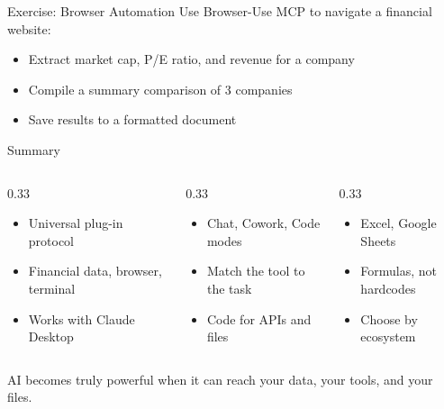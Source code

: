 \documentclass[aspectratio=169]{beamer}
\begin{document}
\begin{frame}{Exercise: Browser Automation}
Use Browser-Use MCP to navigate a financial website:
\begin{itemize}
  \item Extract market cap, P/E ratio, and revenue for a company
  \item Compile a summary comparison of 3 companies
  \item Save results to a formatted document
\end{itemize}
\end{frame}

\begin{frame}{Summary}
\begin{columns}[T]
\begin{column}{0.33\textwidth}
\begin{shadedbox}[title=\textbf{MCP}]
\begin{itemize}\small
  \item Universal plug-in protocol
  \item Financial data, browser, terminal
  \item Works with Claude Desktop
\end{itemize}
\end{shadedbox}
\end{column}
\begin{column}{0.33\textwidth}
\begin{shadedbox}[title=\textbf{Code Execution}]
\begin{itemize}\small
  \item Chat, Cowork, Code modes
  \item Match the tool to the task
  \item Code for APIs and files
\end{itemize}
\end{shadedbox}
\end{column}
\begin{column}{0.33\textwidth}
\begin{shadedbox}[title=\textbf{AI in Apps}]
\begin{itemize}\small
  \item Excel, Google Sheets
  \item Formulas, not hardcodes
  \item Choose by ecosystem
\end{itemize}
\end{shadedbox}
\end{column}
\end{columns}
\vspace{0.5cm}
\begin{center}
\alert{AI becomes truly powerful when it can reach your data, your tools, and your files.}
\end{center}
\end{frame}
\end{document}

